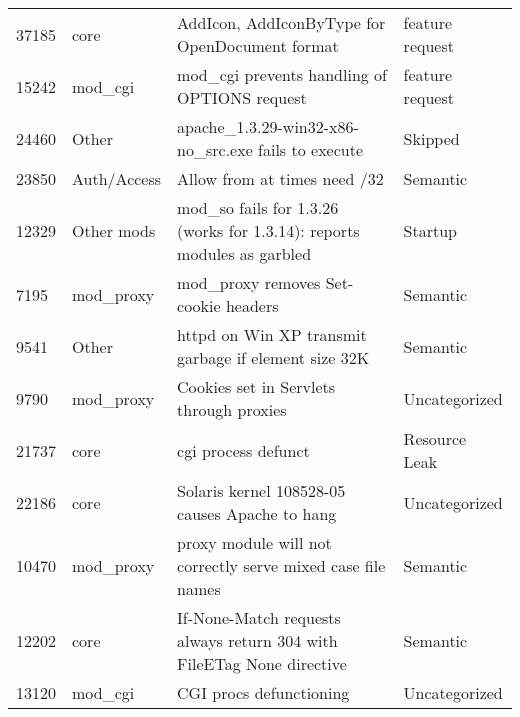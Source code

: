 \begin{longtable}[c]{p{1cm}p{3cm}p{6cm}p{4cm}}
37185  & core               & AddIcon, AddIconByType for OpenDocument format                                                                 & feature request   \\
15242  & mod\_cgi           & mod\_cgi prevents handling of OPTIONS request                                                                  & feature request   \\
24460  & Other              & apache\_1.3.29-win32-x86-no\_src.exe fails to execute                                                          & Skipped           \\
23850  & Auth/Access        & Allow from at times need /32                                                                                   & Semantic          \\
12329  & Other mods         & mod\_so fails for 1.3.26 (works for 1.3.14): reports modules as garbled                                        & Startup           \\
7195   & mod\_proxy         & mod\_proxy removes Set-cookie headers                                                                          & Semantic          \\
9541   & Other              & httpd on Win XP transmit garbage if element size 32K                                               & Semantic          \\
9790   & mod\_proxy         & Cookies set in Servlets through proxies                                                                        & Uncategorized     \\
21737  & core               & cgi process defunct                                                                                            & Resource Leak     \\
22186  & core               & Solaris kernel 108528-05 causes Apache to hang                                                                 & Uncategorized     \\
10470  & mod\_proxy         & proxy module will not correctly serve mixed case file names                                                    & Semantic          \\
12202  & core               & If-None-Match requests always return 304 with FileETag None directive                                          & Semantic          \\
13120  & mod\_cgi           & CGI procs defunctioning                                                                                        & Uncategorized     \\

\end{longtable}
